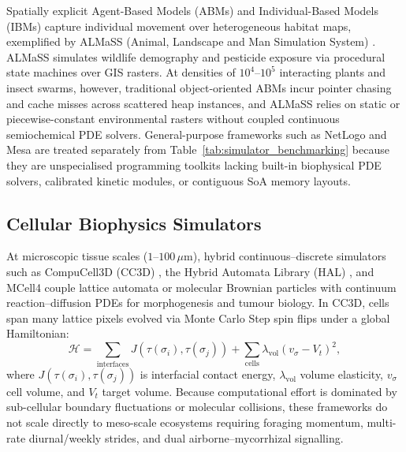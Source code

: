 Spatially explicit Agent-Based Models (ABMs) and Individual-Based Models (IBMs) capture individual movement over heterogeneous habitat maps, exemplified by ALMaSS (Animal, Landscape and Man Simulation System) \cite{topping2003almass}. ALMaSS simulates wildlife demography and pesticide exposure via procedural state machines over GIS rasters. At densities of $10^4\text{--}10^5$ interacting plants and insect swarms, however, traditional object-oriented ABMs incur pointer chasing and cache misses across scattered heap instances, and ALMaSS relies on static or piecewise-constant environmental rasters without coupled continuous semiochemical PDE solvers. General-purpose frameworks such as NetLogo \cite{wilensky1999netlogo} and Mesa \cite{kazil2020mesa} are treated separately from Table~\ref{tab:simulator_benchmarking} because they are unspecialised programming toolkits lacking built-in biophysical PDE solvers, calibrated kinetic modules, or contiguous SoA memory layouts.

\subsection{Cellular Biophysics Simulators}
\label{sec:related_cpm}

At microscopic tissue scales ($1\text{--}100\,\mu\text{m}$), hybrid continuous--discrete simulators such as CompuCell3D (CC3D) \cite{swat2012multiscale}, the Hybrid Automata Library (HAL) \cite{bravo2020hybrid}, and MCell4 \cite{husar2024mcell4} couple lattice automata or molecular Brownian particles with continuum reaction--diffusion PDEs for morphogenesis and tumour biology. In CC3D, cells span many lattice pixels evolved via Monte Carlo Step spin flips under a global Hamiltonian:
\begin{equation}
  \mathcal{H} = \sum_{\text{interfaces}} J(\tau(\sigma_i), \tau(\sigma_j)) + \sum_{\text{cells}} \lambda_{\text{vol}} (v_\sigma - V_t)^2,
  \label{eq:cc3d_hamiltonian}
\end{equation}
where $J(\tau(\sigma_i), \tau(\sigma_j))$ is interfacial contact energy, $\lambda_{\text{vol}}$ volume elasticity, $v_\sigma$ cell volume, and $V_t$ target volume. Because computational effort is dominated by sub-cellular boundary fluctuations or molecular collisions, these frameworks do not scale directly to meso-scale ecosystems requiring foraging momentum, multi-rate diurnal/weekly strides, and dual airborne--mycorrhizal signalling.

\begin{table}[b]
  \centering
  \caption{Methodological Comparison Across Domain-Specific Ecological and Biophysical Simulation Architectures.}
  \label{tab:simulator_benchmarking}
  
\end{table}

